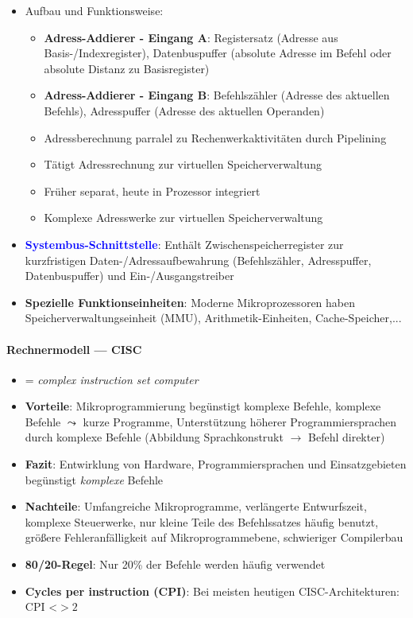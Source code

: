 \begin{itemize}
	\item Aufbau und Funktionsweise:
	\begin{itemize}
		\item \textbf{Adress-Addierer - Eingang A}: Registersatz (Adresse aus Basis-/Indexregister), Datenbuspuffer (absolute Adresse im Befehl oder absolute Distanz zu Basisregister)
		\item \textbf{Adress-Addierer - Eingang B}: Befehlszähler (Adresse des aktuellen Befehls), Adresspuffer (Adresse des aktuellen Operanden)
		\item Adressberechnung parralel zu Rechenwerkaktivitäten durch Pipelining
		\item Tätigt Adressrechnung zur virtuellen Speicherverwaltung
		\item Früher separat, heute in Prozessor integriert
		\item Komplexe Adresswerke zur virtuellen Speicherverwaltung
	\end{itemize}

	\item \textbf{\textcolor{blue}{Systembus-Schnittstelle}}: Enthält Zwischenspeicherregister zur kurzfristigen Daten-/Adressaufbewahrung (Befehlszähler, Adresspuffer, Datenbuspuffer) und Ein-/Ausgangstreiber

	\item \textbf{Spezielle Funktionseinheiten}: Moderne Mikroprozessoren haben Speicherverwaltungseinheit (MMU), Arithmetik-Einheiten, Cache-Speicher,...
\end{itemize}

\paragraph{Rechnermodell --- CISC}
\begin{itemize}
	\item = \emph{complex instruction set computer}
	\item \textbf{Vorteile}: Mikroprogrammierung begünstigt komplexe Befehle, komplexe Befehle $\leadsto$ kurze Programme, Unterstützung höherer Programmiersprachen durch komplexe Befehle (Abbildung Sprachkonstrukt $\to$ Befehl direkter)
	\item \textbf{Fazit}: Entwirklung von Hardware, Programmiersprachen und Einsatzgebieten begünstigt \emph{komplexe} Befehle
	\item \textbf{Nachteile}: Umfangreiche Mikroprogramme, verlängerte Entwurfszeit, komplexe Steuerwerke, nur kleine Teile des Befehlssatzes häufig benutzt, größere Fehleranfälligkeit auf Mikroprogrammebene, schwieriger Compilerbau
	\item \textbf{80/20-Regel}: Nur 20\% der Befehle werden häufig verwendet
	\item \textbf{Cycles per instruction (CPI)}: Bei meisten heutigen CISC-Architekturen: CPI <$>2$
\end{itemize}

